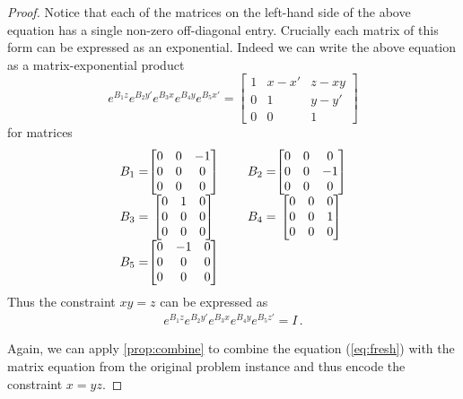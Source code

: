 \begin{proof}
Notice that each of the matrices on the left-hand side of the above
equation has a single non-zero off-diagonal entry.  Crucially each
matrix of this form can be expressed as an exponential.  Indeed we can
write the above equation as a matrix-exponential product
\[ e^{B_1z} e^{B_2y'} e^{B_3x} e^{B_4y} e^{B_5x'} = \begin{bmatrix}1&x-x'&z-xy\\0&1&y-y'\\0&0&1\end{bmatrix} \]
for matrices
\[\begin{array}{r@{}cp{.1cm}r@{}c}
B_1=&\begin{bmatrix}0&0&-1\\0&0&0\\0&0&0\end{bmatrix} &&
B_2=&\begin{bmatrix}0&0&0\\0&0&-1\\0&0&0\end{bmatrix} \\
B_3=&\begin{bmatrix}0&1&0\\0&0&0\\0&0&0\end{bmatrix} &&
B_4=&\begin{bmatrix}0&0&0\\0&0&1\\0&0&0\end{bmatrix} \\
B_5=&\begin{bmatrix}0&-1&0\\0&0&0\\0&0&0\end{bmatrix} &&
\end{array}\]
Thus the constraint $xy=z$ can be expressed as
\begin{gather}
e^{B_1z} e^{B_2y'} e^{B_3x} e^{B_4y} e^{B_5z'} = I \, .
\label{eq:fresh}
\end{gather}

Again, we can apply \cref{prop:combine} to combine the
equation (\ref{eq:fresh}) with the matrix equation from the original
problem instance and thus encode the constraint $x=yz$.


\end{proof}
